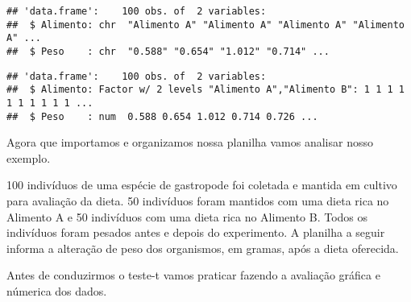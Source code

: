 \documentclass[]{book}
\newenvironment{Shaded}{\begin{snugshade}}{\end{snugshade}}
\newcommand{\CommentTok}[1]{\textcolor[rgb]{0.56,0.35,0.01}{\textit{#1}}}
\newcommand{\DataTypeTok}[1]{\textcolor[rgb]{0.13,0.29,0.53}{#1}}
\newcommand{\KeywordTok}[1]{\textcolor[rgb]{0.13,0.29,0.53}{\textbf{#1}}}
\newcommand{\NormalTok}[1]{#1}
\newcommand{\OperatorTok}[1]{\textcolor[rgb]{0.81,0.36,0.00}{\textbf{#1}}}
\newcommand{\StringTok}[1]{\textcolor[rgb]{0.31,0.60,0.02}{#1}}
\begin{document}
\begin{verbatim}
## 'data.frame':    100 obs. of  2 variables:
##  $ Alimento: chr  "Alimento A" "Alimento A" "Alimento A" "Alimento A" ...
##  $ Peso    : chr  "0.588" "0.654" "1.012" "0.714" ...
\end{verbatim}

\begin{Shaded}
\end{Shaded}

\begin{verbatim}
## 'data.frame':    100 obs. of  2 variables:
##  $ Alimento: Factor w/ 2 levels "Alimento A","Alimento B": 1 1 1 1 1 1 1 1 1 1 ...
##  $ Peso    : num  0.588 0.654 1.012 0.714 0.726 ...
\end{verbatim}

Agora que importamos e organizamos nossa planilha vamos analisar nosso exemplo.

100 indivíduos de uma espécie de gastropode foi coletada e mantida em cultivo para avaliação da dieta. 50 indivíduos foram mantidos com uma dieta rica no Alimento A e 50 indivíduos com uma dieta rica no Alimento B. Todos os indivíduos foram pesados antes e depois do experimento. A planilha a seguir informa a alteração de peso dos organismos, em gramas, após a dieta oferecida.

Antes de conduzirmos o teste-t vamos praticar fazendo a avaliação gráfica e númerica dos dados.

\begin{Shaded}
\end{Shaded}
\end{document}
